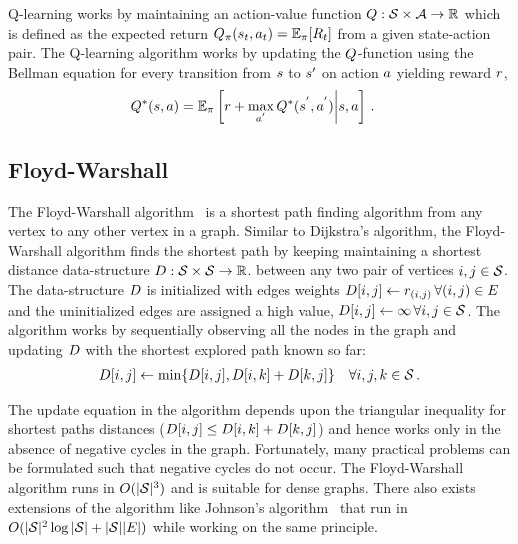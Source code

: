 Q-learning works by maintaining an action-value function $Q : \mathcal{S} \times
\mathcal{A} \rightarrow \mathbb{R}$ which is defined as the expected return
$Q_\pi(s_t, a_t) = \mathbb{E}_\pi[R_t]$ from a given state-action pair.
The Q-learning algorithm works by updating the $Q$-function using the Bellman
equation for every transition from $s$ to $s'$ on action $a$
yielding reward $r$, 
%
\begin{align}
  Q^*(s, a) &= \mathbb{E}_{\pi}\left[
                       r + \max_{a^{'}} Q^*(s^{'}, a^{'})
                       \middle| s, a \right] \, .
    \label{eq:q-learn-bellman}
\end{align}%
%

\subsection{Floyd-Warshall}

The Floyd-Warshall algorithm~\citep{floydwarshall1962} is a shortest path finding
algorithm from any vertex to any other vertex in a graph.
Similar to Dijkstra's algorithm, the Floyd-Warshall algorithm
finds the shortest path by keeping maintaining a shortest distance
data-structure $D : \mathcal{S} \times \mathcal{S} \rightarrow \mathbb{R}$. between any
two pair of vertices $i, j \in \mathcal{S}$.
The data-structure $D$ is initialized with edges weights
$D[i, j] \leftarrow r_{(i, j)} \, \forall (i, j) \in E$
and the uninitialized edges are assigned a high value,
$D[i, j] \leftarrow \infty \, \forall i, j \in \mathcal{S}$.
The algorithm works by sequentially observing all the nodes in the graph and
updating $D$ with the shortest explored path known so far:
%
\begin{align}
  D[i, j] \leftarrow \min\{ D[i, j], D[i, k] + D[k, j] \} \quad
  \forall i, j, k \in \mathcal{S} \, .
\end{align}%
%


The update equation in the algorithm depends upon the triangular inequality for
shortest paths distances ($D[i, j] \le D[i, k] + D[k, j]$) and hence
works only in the absence of negative cycles in the graph. Fortunately, many
practical problems can be formulated such that negative cycles
do not occur. The Floyd-Warshall algorithm runs in $O(|\mathcal{S}|^3)$
and is suitable for dense graphs. There also exists extensions of the algorithm
like Johnson's algorithm~\citep{johnson1977efficient} that run in
$O(|\mathcal{S}|^2\log|\mathcal{S}| + |\mathcal{S}||E|)$ while working on
the same principle.

